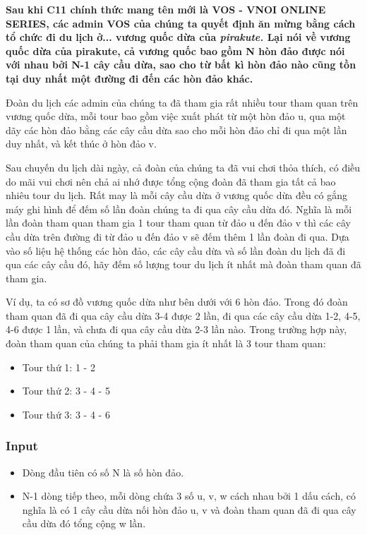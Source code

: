 

\textbf{Sau khi C11 chính thức mang tên mới là VOS - VNOI ONLINE SERIES, các admin VOS của chúng ta quyết định ăn mừng bằng cách tổ chức đi du lịch ở... vương quốc dừa của \emph{ pirakute. } Lại nói về vương quốc dừa của pirakute, cả vương quốc bao gồm \textbf{ N }\textbf{}\textbf{ hòn đảo được nói với nhau bởi }\textbf{\textbf{ N-1 }}\textbf{ cây cầu dừa, sao cho từ bất kì hòn đảo nào cũng tồn tại duy nhất một đường đi đến các hòn đảo khác. }}

Đoàn du lịch các admin của chúng ta đã tham gia rất nhiều tour tham quan trên vương quốc dừa, mỗi tour bao gồm việc xuất phát từ một hòn đảo u, qua một dãy các hòn đảo bằng các cây cầu dừa sao cho mỗi hòn đảo chỉ đi qua một lần duy nhất, và kết thúc ở hòn đảo v.

Sau chuyến du lịch dài ngày, cả đoàn của chúng ta đã vui chơi thỏa thích, có điều do mãi vui chơi nên chả ai nhớ được tổng cộng đoàn đã tham gia tất cả bao nhiêu tour du lịch. Rất may là mỗi cây cầu dừa ở vương quốc dừa đều có gắng máy ghi hình để đếm số lần đoàn chúng ta đi qua cây cầu dừa đó. Nghĩa là mỗi lần đoàn tham quan tham gia 1 tour tham quan từ đảo u đến đảo v thì các cây cầu dừa trên đường đi từ đảo u đến đảo v sẽ đếm thêm 1 lần đoàn đi qua. Dựa vào số liệu hệ thống các hòn đảo, các cây cầu dừa và số lần đoàn du lịch đã đi qua các cây cầu đó, hãy đếm số lượng tour du lịch ít nhất mà đoàn tham quan đã tham gia.

Ví dụ, ta có sơ đồ vương quốc dừa như bên dưới với 6 hòn đảo. Trong đó đoàn tham quan đã đi qua cây cầu dừa 3-4 được 2 lần, đi qua các cây cầu dừa 1-2, 4-5, 4-6 được 1 lần, và chưa đi qua cây cầu dừa 2-3 lần nào. Trong trường hợp này, đoàn tham quan của chúng ta phải tham gia ít nhất là 3 tour tham quan:
\begin{itemize}
	\item Tour thứ 1: 1 - 2
	\item Tour thứ 2: 3 - 4 - 5
	\item Tour thứ 3: 3 - 4 - 6
\end{itemize}

\subsubsection{Input}
\begin{itemize}
	\item Dòng đầu tiên có số N là số hòn đảo.
	\item N-1 dòng tiếp theo, mỗi dòng chứa 3 số u, v, w cách nhau bởi 1 dấu cách, có nghĩa là có 1 cây cầu dừa nối hòn đảo u, v và đoàn tham quan đã đi qua cây cầu dừa đó tổng cộng w lần.
\end{itemize}

